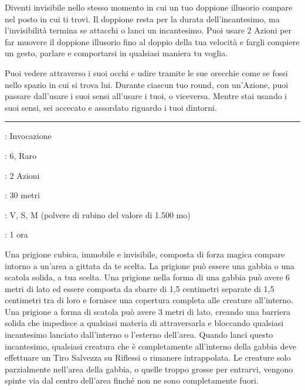 \begin{multicols}{2}
Diventi invisibile nello stesso momento in cui un tuo doppione illusorio compare nel posto in cui ti trovi. Il doppione resta per la durata dell'incantesimo, ma l'invisibilità termina se attacchi o lanci un incantesimo. Puoi usare 2 Azioni per far muovere il doppione illusorio fino al doppio della tua velocità e fargli compiere un gesto, parlare e comportarsi in qualsiasi maniera tu voglia.

Puoi vedere attraverso i suoi occhi e udire tramite le sue orecchie come se fossi nello spazio in cui si trova lui. Durante ciascun tuo round, con un'Azione, puoi passare dall'usare i suoi sensi all'usare i tuoi, o viceversa. Mentre stai usando i suoi sensi, sei accecato e assordato riguardo i tuoi dintorni.

\smallskip\noindent\rule{\linewidth}{2pt} \hypertarget{Gabbia di Forza}{}\medskip{}
\noindent
\begin{description}[noitemsep, topsep=0pt, parsep=0pt, partopsep=0pt, leftmargin=0cm, labelwidth=2.8cm]
	\item[\textbf{Lista di Magia}]: Invocazione
	\item[\textbf{Livello}]: 6, Raro
	\item[\textbf{T. di Lancio}]: 2 Azioni
	\item[\textbf{Gittata}]: 30 metri
	\item[\textbf{Componenti}]: V, S, M (polvere di rubino del valore di 1.500 mo)
	\item[\textbf{Durata}]: 1 ora
\end{description}

Una prigione cubica, immobile e invisibile, composta di forza magica compare intorno a un'area a gittata da te scelta. La prigione può essere una gabbia o una scatola solida, a tua scelta. Una prigione nella forma di una gabbia può avere 6 metri di lato ed essere composta da sbarre di 1,5 centimetri separate di 1,5 centimetri tra di loro e fornisce una copertura completa alle creature all'interno. Una prigione a forma di scatola può avere 3 metri di lato, creando una barriera solida che impedisce a qualsiasi materia di attraversarla e bloccando qualsiasi incantesimo lanciato dall'interno o l'esterno dell'area. Quando lanci questo incantesimo, qualsiasi creatura che è completamente all'interno della gabbia deve effettuare un Tiro Salvezza su Riflessi o rimanere intrappolata. Le creature solo parzialmente nell'area della gabbia, o quelle troppo grosse per entrarvi, vengono spinte via dal centro dell'area finché non ne sono completamente fuori.


\end{multicols}
